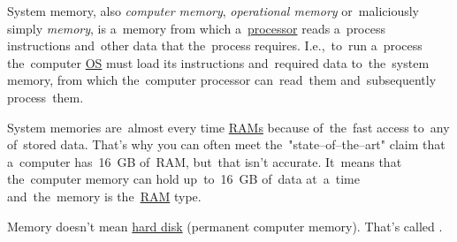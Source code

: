 \label{systemmemory}
System memory, also \textit{computer memory}, \textit{operational memory} or~maliciously simply \textit{memory}, is a~memory from which a~\hyperref[processorcpucore]{processor} reads a~process instructions and~other data that the~process requires.
I.e.,~to~run a~process the~computer \hyperref[os]{OS} must load its instructions and~required data to~the~system memory, from which the~computer processor can~read~them and~subsequently process~them.

System memories are~almost every time \hyperref[ram]{RAMs} because of~the~fast access to~any of~stored data.
That's why you can often meet the~"state--of--the--art" claim that a~computer has~16~GB of~RAM, but~that isn't accurate.
It~means that the~computer memory can hold up~to~16~GB of~data at~a~time and~the~memory is the~\hyperref[ram]{RAM} type.

\warning Memory doesn't mean \hyperref[harddiskdrive]{hard disk} (permanent computer memory).
That's called \hyperref[harddiskdrive]{}.
\newpage
